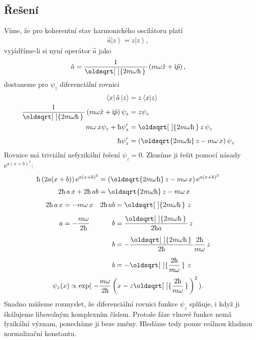 \documentclass[10pt,a4paper]{article}
\renewcommand*{\sqrt}[2][\ ]{\oldsqrt[#1]{#2\,}\,}
\newcommand{\const}[1]{\text{#1}}
\newcommand{\bra}[1]{\left< #1 \right|}
\newcommand{\ket}[1]{\left| #1 \right>}
\newcommand{\braket}[2]{\left< #1 \middle| #2 \right>}
\newcommand{\e}[1]{\const{e}^{#1}}
\renewcommand{\i}{\const{i}}
\begin{document}
\subsection{Řešení}
Víme, že pro koherentní stav harmonického oscilátoru platí
\begin{align*}
    \hat{a} \ket{z} = z \ket{z},
\end{align*}
vyjádříme-li si nyní operátor $\hat{a}$ jako
\begin{align*}
    \hat{a} = \frac{1}{\sqrt{2m\omega\hbar}}\left( m \omega \hat{x} + \i \hat{p} \right),
\end{align*}
dostaneme pro $\psi_z$ diferenciální rovnici
\begin{align*}
    \bra{x} \hat{a} \ket{z} &= z \braket{x}{z}
    \\
    \frac{1}{\sqrt{2m\omega\hbar}}\left( m \omega \hat{x} + \i \hat{p} \right) \psi_z &= z \psi_z
    \\
    m \omega \, x \psi_z + \hbar \psi'_z &= \sqrt{2m\omega\hbar} z \, \psi_z
    \\[5pt]
    \hbar \psi'_z &= \left( \oldsqrt{2m\omega\hbar} \, z - m \omega \, x\right) \psi_z
\end{align*}
Rovnice má triviální nefyzikální řešení $\psi_z = 0$. Zkusíme ji řešit pomocí násady $\e{a(x+b)^2}$:
\begin{align*}
    \hbar \left(2a(x+b)\right) \e{a\left(x+b\right)^2} &= \left( \oldsqrt{2m\omega\hbar} \, z - m \omega \, x\right) \e{a\left(x+b\right)^2}
    \\[3pt]
    2\hbar \, a \, x + 2\hbar \, ab &= \oldsqrt{2m\omega\hbar} \, z - m \omega \, x
\end{align*}
\begin{align*}
    2\hbar \, a \, x &= -m \omega \, x
    & 2\hbar \, ab &= \sqrt{2m\omega\hbar} \, z
    \\[5pt]
    a &= - \frac{m\omega}{2\hbar}
    & b &= \frac{\sqrt{2m\omega\hbar}}{2\hbar a} \, z
    \\[5pt]
    & & b &= - \frac{\sqrt{2m\omega\hbar}}{2\hbar} \frac{2\hbar}{m\omega} \, z
    \\[5pt]
    & & b &= - \sqrt{\frac{2\hbar}{m\omega}} \, z
\end{align*}
\begin{align*}
    \psi_z(x) \propto \exp ( \; { -\frac{m\omega}{2\hbar} \left( x - z \sqrt{\frac{2\hbar}{m\omega}} \right)^2 } \, ).
\end{align*}
Snadno můžeme rozmyslet, že diferenciální rovnici funkce $\psi_z$ splňuje, i když ji škálujeme libovolným komplexním číslem. Protože fáze vlnové funkce nemá fyzikální význam, ponecháme ji beze změny. Hledáme tedy pouze reálnou kladnou normalizační konstantu.
\end{document}
